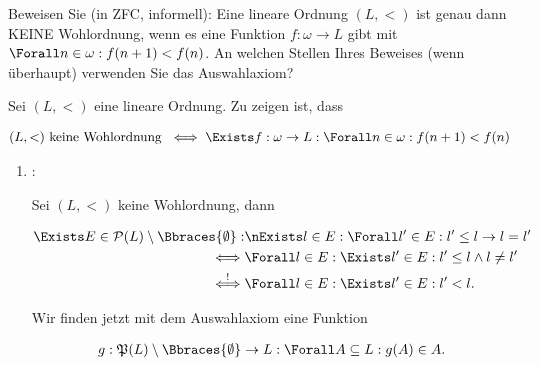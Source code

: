 
\begin{exercise}[286]

Beweisen Sie (in ZFC, informell):
Eine lineare Ordnung $(L, <)$ ist genau dann KEINE Wohlordnung, wenn es eine Funktion $f: \omega \to L$ gibt mit $\Forall n \in \omega: f(n + 1) < f(n)$.
An welchen Stellen Ihres Beweises (wenn überhaupt) verwenden Sie das Auswahlaxiom?

\end{exercise}


\begin{solution}

Sei $(L, <)$ eine lineare Ordnung.
Zu zeigen ist, dass

\begin{align*}
    (L, <) ~\text{keine Wohlordnung}~
    \iff
    \Exists f: \omega \to L:
        \Forall n \in \omega:
            f(n + 1) < f(n)
\end{align*}

\begin{enumerate}[label = \texttt{ad}]

    \item \Quote{$\implies$}:

    Sei $(L, <)$ keine Wohlordnung, dann

    \begin{align} \label{eq:keine_Wohlordnung}
        \begin{split}
            \Exists E \in \mathcal{P}(L) \setminus \Bbraces{\emptyset}:
                & \nExists l \in E:
                    \Forall l^\prime \in E:
                        l^\prime \leq l \to l = l^\prime \\
                \iff
                & \Forall l \in E:
                    \Exists l^\prime \in E:
                        l^\prime \leq l \land l \neq l^\prime \\
                \stackrel{!}{\iff}
                & \Forall l \in E:
                    \Exists l^\prime \in E:
                        l^\prime < l.
        \end{split}
    \end{align}

    Wir finden jetzt mit dem Auswahlaxiom eine Funktion

    \begin{align*}
        g:
        \mathfrak{P}(L) \setminus \Bbraces{\emptyset} \to L:
            \Forall A \subseteq L:
                g(A) \in A.
    \end{align*}


\end{enumerate}
\end{solution}
